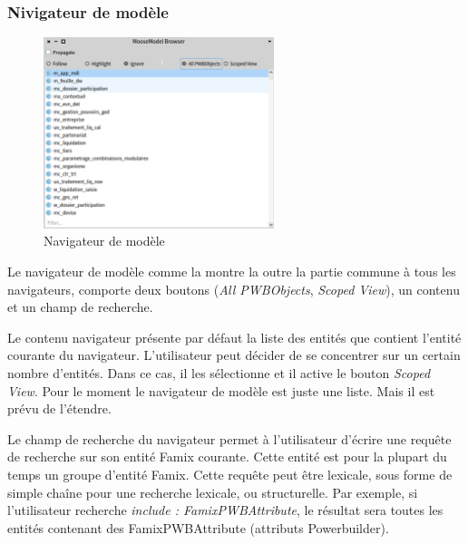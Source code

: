 \documentclass[a4paper]{article}
\begin{document}
\subsubsection{Nivigateur de modèle}

\begin{figure}[htbp]
  \begin{center}
  \includegraphics[width=0.6\textwidth]{./figures/modelBrowser.png}
  \caption{Navigateur de modèle}
  \label{fig:modelBrowser}
\end{center}
\vspace{-0.3cm}
\end{figure}
Le navigateur de modèle comme la montre la  outre la partie commune à tous les navigateurs, comporte deux boutons (\textit{All PWBObjects}, \textit{Scoped View}), un contenu et un champ de recherche.

Le contenu navigateur présente par défaut la liste des entités que contient l'entité courante du navigateur. 
L'utilisateur peut décider de se concentrer sur un certain nombre d'entités. Dans ce cas, il les sélectionne et il active le bouton \textit{Scoped View}.
Pour le moment le navigateur de modèle est juste une liste. Mais il est prévu de l'étendre.

Le champ de recherche du navigateur permet à l'utilisateur d'écrire une requête de recherche sur son entité Famix courante.
Cette entité est pour la plupart du temps un groupe d'entité Famix.
Cette requête peut être lexicale, sous forme de simple chaîne pour une recherche lexicale, ou structurelle.
Par exemple, si l'utilisateur recherche \textit{include : FamixPWBAttribute}, le résultat sera toutes les entités contenant des FamixPWBAttribute (attributs Powerbuilder).

\end{document}
